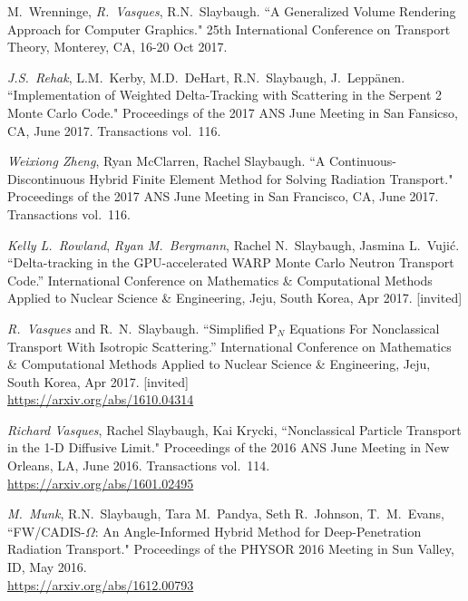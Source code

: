 \begin{bibsection}
\item M.\ Wrenninge, \textit{R.\ Vasques}, R.N.\ Slaybaugh. ``A Generalized Volume Rendering Approach for Computer Graphics." 25th International Conference on Transport Theory, Monterey, CA, 16-20 Oct 2017.

\item \textit{J.S.\ Rehak}, L.M.\ Kerby, M.D.\ DeHart, R.N.\ Slaybaugh, J.\ Lepp\"{a}nen. ``Implementation of Weighted Delta-Tracking with Scattering in the Serpent 2 Monte Carlo Code." Proceedings of the 2017 ANS June Meeting in San Fansicso, CA, June 2017. Transactions vol.\ 116.

\item\textit{ Weixiong Zheng}, Ryan McClarren, Rachel Slaybaugh. ``A Continuous-Discontinuous Hybrid Finite Element Method for Solving Radiation Transport." Proceedings of the 2017 ANS June Meeting in San Francisco, CA, June 2017. Transactions vol.\ 116.

\item \textit{Kelly L.\ Rowland}, \textit{Ryan M.\ Bergmann}, Rachel N.\ Slaybaugh, Jasmina L.\ Vuji\'c. ``Delta-tracking in the GPU-accelerated WARP Monte Carlo Neutron Transport Code.'' International Conference on Mathematics \& Computational Methods Applied to Nuclear Science \& Engineering, Jeju, South Korea, Apr 2017. [invited]

\item \textit{R.\ Vasques} and R.\ N.\ Slaybaugh. ``Simplified P$_N$ Equations For Nonclassical Transport With Isotropic Scattering.'' International Conference on Mathematics \& Computational Methods Applied to Nuclear Science \& Engineering, Jeju, South Korea, Apr 2017. [invited]\\
\url{https://arxiv.org/abs/1610.04314}

\item \textit{Richard Vasques}, Rachel Slaybaugh, Kai Krycki, ``Nonclassical Particle Transport in the 1-D Diffusive Limit." Proceedings of the 2016 ANS June Meeting in New Orleans, LA, June 2016. Transactions vol.\ 114.\\
\url{https://arxiv.org/abs/1601.02495}

\item \textit{M.\ Munk}, R.N.\ Slaybaugh, Tara M.~Pandya, Seth R.~Johnson, T.~M.~Evans, ``FW/CADIS-$\Omega$: An Angle-Informed Hybrid Method for Deep-Penetration Radiation Transport." Proceedings of the PHYSOR 2016 Meeting in Sun Valley, ID, May 2016.\\
\url{https://arxiv.org/abs/1612.00793}


\end{bibsection}
